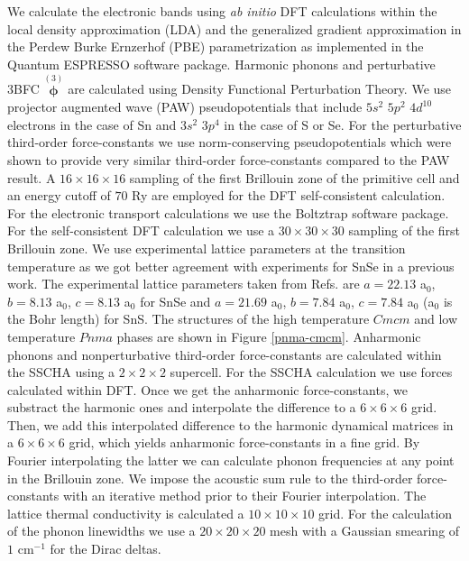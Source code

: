 We calculate the electronic bands using {\it ab initio} DFT calculations within the local density approximation (LDA)\cite{perdew1981self} and the generalized gradient approximation in the Perdew Burke
Ernzerhof (PBE) parametrization\cite{perdew1996generalized} as implemented in the {\sc Quantum ESPRESSO}\cite{giannozzi2009quantum} software package. Harmonic phonons and perturbative 3BFC $\overset{(3)}{\boldsymbol{\phi}}$ 
are calculated  using Density Functional Perturbation Theory\cite{baroni2001phonons,paulatto2013anharmonic}. We use projector augmented wave\cite{blochl1994projector} (PAW) pseudopotentials that 
include $5s^{2}$ $5p^{2}$ $4d^{10}$ electrons in the case of Sn and $3s^{2}$ $3p^{4}$ in the case of S or Se. For the perturbative third-order force-constants we use norm-conserving pseudopotentials which were 
shown\cite{aseginolaza2019phonon} to provide very similar third-order force-constants compared to the PAW result. A $16\times16\times16$ sampling of the first Brillouin zone of the primitive cell and an energy
cutoff of $70$ Ry are employed for the DFT self-consistent calculation. For the electronic transport calculations we use the Boltztrap software package\cite{madsen2006boltztrap}. For the self-consistent DFT calculation we 
use a $30\times30\times30$ sampling of the first Brillouin zone. We use experimental lattice parameters at the transition temperature as we got better agreement with experiments for SnSe in a previous
work\cite{aseginolaza2019phonon}. The experimental lattice parameters taken from Refs.\cite{adouby1998structure,chattopadhyay1986neutron} are $a=22.13$ a$_{0}$, $b=8.13$ a$_{0}$, $c=8.13$ a$_{0}$ for SnSe
and $a=21.69$ a$_{0}$, $b=7.84$ a$_{0}$, $c=7.84$ a$_{0}$ (a$_{0}$ is the Bohr length) for SnS. The structures of the high temperature $Cmcm$ and low temperature $Pnma$ phases are shown in Figure \ref{pnma-cmcm}.
Anharmonic phonons and nonperturbative third-order force-constants are calculated within the SSCHA using a $2\times2\times2$ supercell. For the SSCHA calculation we use forces calculated within DFT. Once we get the anharmonic
force-constants, we substract the harmonic ones and interpolate the difference to a $6\times6\times6$ grid. Then, we add this interpolated difference to the harmonic dynamical matrices in a $6\times6\times6$ grid, which yields
anharmonic force-constants in a fine grid. By Fourier interpolating the latter we can calculate phonon frequencies at any point in the Brillouin zone. We impose the acoustic sum rule to the third-order force-constants with an
iterative method prior to their Fourier interpolation\cite{paulatto2013anharmonic,aseginolaza2019phonon}. The lattice thermal conductivity is calculated a $10\times10\times10$ grid. For the calculation of the phonon linewidths 
we use a $20\times20\times20$ mesh with a Gaussian smearing of $1$ cm$^{-1}$ for the Dirac deltas.

